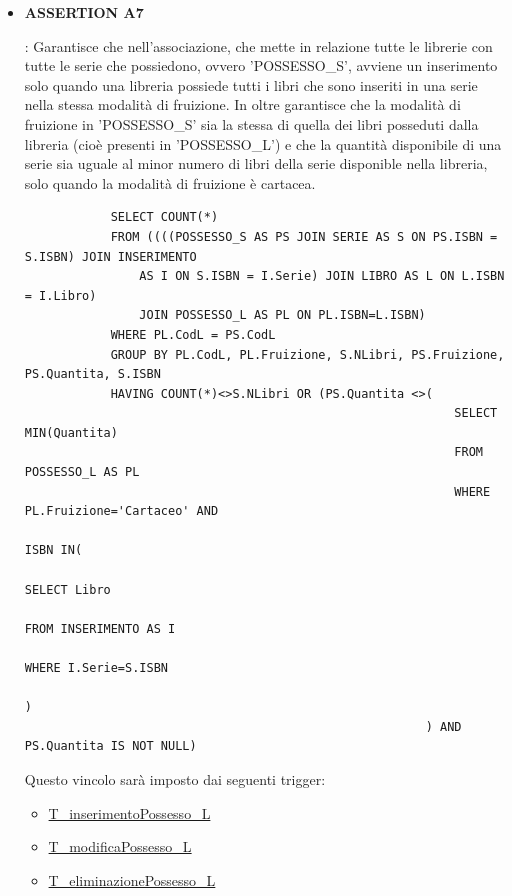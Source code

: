 \documentclass{article}
\begin{document}
\begin{itemize}
    \item \hypertarget{assertion7}{\textbf{ASSERTION A7}}: Garantisce che nell'associazione, che mette in relazione tutte le librerie con tutte le serie che possiedono, ovvero 'POSSESSO\_S', avviene un inserimento solo quando una libreria possiede tutti i libri che sono inseriti in una serie nella stessa modalità di fruizione. In oltre garantisce che la modalità di fruizione in 'POSSESSO\_S' sia la stessa di quella dei libri posseduti dalla libreria (cioè presenti in 'POSSESSO\_L') e che la quantità disponibile di una serie sia uguale al minor numero di libri della serie disponible nella libreria, solo quando la modalità di fruizione è cartacea.
    \newpage
        \begin{verbatim}
            SELECT COUNT(*)
            FROM ((((POSSESSO_S AS PS JOIN SERIE AS S ON PS.ISBN = S.ISBN) JOIN INSERIMENTO
                AS I ON S.ISBN = I.Serie) JOIN LIBRO AS L ON L.ISBN = I.Libro) 
                JOIN POSSESSO_L AS PL ON PL.ISBN=L.ISBN)
            WHERE PL.CodL = PS.CodL
            GROUP BY PL.CodL, PL.Fruizione, S.NLibri, PS.Fruizione, PS.Quantita, S.ISBN
            HAVING COUNT(*)<>S.NLibri OR (PS.Quantita <>(
                                                            SELECT MIN(Quantita)
                                                            FROM POSSESSO_L AS PL
                                                            WHERE PL.Fruizione='Cartaceo' AND 
                                                                ISBN IN(
                                                                        SELECT Libro
                                                                        FROM INSERIMENTO AS I
                                                                        WHERE I.Serie=S.ISBN
                                                                    )      
                                                        ) AND PS.Quantita IS NOT NULL)                    
        \end{verbatim}
    Questo vincolo sarà imposto dai seguenti trigger:
        \begin{itemize}
            \item \hyperlink{t18}{T\_inserimentoPossesso\_L}
            \item \hyperlink{t19}{T\_modificaPossesso\_L}
            \item \hyperlink{t20}{T\_eliminazionePossesso\_L}
        \end{itemize}  
\end{itemize}
\end{document}
